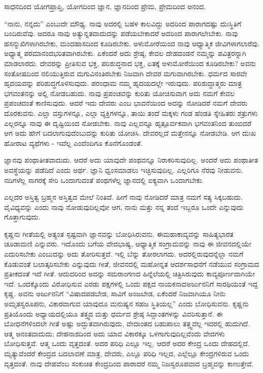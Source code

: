 ಸಾಧನದಿಂದ ಯೋಗಪ್ರಾಪ್ತಿ, ಯೋಗದಿಂದ ಜ್ಞಾನ, ಜ್ಞಾನದಿಂದ ಪ್ರೇಮ, ಪ್ರೇಮದಿಂದ ಆನಂದ.

“ನಾನು, ನನ್ನದು” ಎಂಬುದೇ ಮೌಢ್ಯ. ನಾವು ಅದರಲ್ಲಿ ಬಹಳ ಕಾಲವಿದ್ದು ಅದರಿಂದ ಪಾರಾಗದಷ್ಟು ದುಃಸ್ಥಿತಿಗೆ ಬಂದಿರುವೆವು. ಆದರೂ ನಾವು ಅತ್ಯುನ್ನತವಾದುದನ್ನು ಪಡೆಯಬೇಕಾದರೆ ಅದರಿಂದ ಪಾರಾಗಲೇಬೇಕು. ನಾವು ಹಸನ್ಮುಖಿಗಳಾಗಿರಬೇಕು, ಮಂದಹಾಸದಿಂದ ಕೂಡಿರಬೇಕು. ಅಳುಮೋರೆಯಿಂದ ನಾವು ಆಧ್ಯಾತ್ಮಿಕ ಜೀವಿಗಳಾಗಲಾರೆವು. ಅಧ್ಯಾತ್ಮ ಪರಮಾನಂದಭರಿತವಾಗಿರಬೇಕು. ಏಕೆಂದರೆ ಅದು ಶ್ರೇಷ್ಠ, ಕೇವಲ ದೇಹದಂಡನೆ ನಮ್ಮನ್ನು ಪವಿತ್ರರನ್ನಾಗಿ ಮಾಡಲಾರದು. ದೇವರನ್ನು ಪ್ರೀತಿಸುವ ಭಕ್ತ, ಪರಿಶುದ್ಧನಾದ ಭಕ್ತ, ಏತಕ್ಕೆ ಅಳುಮೋರೆಯಿಂದ ಕೂಡಿರಬೇಕು? ಅವನು ಸಂತೋಷದಿಂದ ನಲಿಯುತ್ತಿರುವ ಮಗುವಿನಂತಿರಬೇಕು ನಿಜವಾಗಿ ದೇವರ ಮಗುವಾಗಿರಬೇಕು. ಧರ್ಮದ ಸಾರವೇ ಹೃದಯವನ್ನು ಪರಿಶುದ್ಧಗೊಳಿಸುವುದು. ಪರಂಧಾಮ ನಮ್ಮ ಹೃದಯದಲ್ಲೇ ಇರುವುದು. ಪರಿಶುದ್ಧಾತ್ಮರು ಮಾತ್ರ ಭಗವಂತನನ್ನು ಅಲ್ಲಿ ನೋಡಬಹುದು. ನಾವು ಪ್ರಪಂಚವನ್ನು ಕುರಿತು ಯೋಚಿಸುವಾಗ ಅದು ನಮಗೆ ಕೇವಲ ಪ್ರಪಂಚದಂತೆ ಕಾಣಿಸುವುದು. ಆದರೆ ಇದು ದೇವರು ಎಂಬ ಭಾವನೆಯಿಂದ ಅದನ್ನು ನೋಡಿದರೆ ನಮಗೆ ದೇವರು ದೊರಕುವನು. ಎಲ್ಲಾ ವಸ್ತುಗಳನ್ನೂ, ಎಲ್ಲಾ ವ್ಯಕ್ತಿಗಳನ್ನೂ, ತಾಯಿ ತಂದೆ ಮಕ್ಕಳು ಗಂಡ ಹೆಂಡತಿ ಸ್ನೇಹಿತರು ಶತ್ರುಗಳು ಎಲ್ಲರನ್ನೂ ನಾವು ಈ ದೃಷ್ಟಿಯಿಂದ ನೋಡಬೇಕು. ನಾವು ಎಲ್ಲವನ್ನೂ ಹೃತ್ಪೂರ್ವಕವಾಗಿ ಭಗವಂತನಿಂದ ತುಂಬಿದರೆ ಆಗ ಅದು ಹೇಗೆ ಬದಲಾಗುವುದೆಂಬುದನ್ನು ಕುರಿತು ಯೋಚಿಸಿ. ದೇವರಲ್ಲದೆ ಮತ್ತೇನನ್ನೂ ನೋಡಬೇಡಿ. ಆಗ ದುಃಖ ಹೋರಾಟ ವ್ಯಥೆಗಳು - ಇವೆಲ್ಲ ಎಂದೆಂದಿಗೂ ಕೊನೆಗೊಂಡಂತೆ.

ಜ್ಞಾನವು ಪಂಥಾತೀತವಾದುದು. ಆದರೆ ಅದು ಯಾವುದೇ ಪಂಥವನ್ನೂ ನಿರಾಕರಿಸುವುದಿಲ್ಲ. ಅಂದರೆ ಅದು ಪಂಥಾತೀತ ಅವಸ್ಥೆಯನ್ನು ಪಡೆದಿದೆ ಎಂದು ಅರ್ಥ. ಜ್ಞಾನಿ ಧ್ವಂಸಮಾಡಲು ಇಚ್ಛಿಸುವುದಿಲ್ಲ. ಎಲ್ಲರಿಗೂ ನೆರವು ನೀಡುವನು. ನದಿಗಳೆಲ್ಲ ಸಾಗರಕ್ಕೆ ಸೇರಿ ಒಂದಾಗುವಂತೆ ಪಂಥಗಳೆಲ್ಲ ಜ್ಞಾನದಲ್ಲಿ ಐಕ್ಯವಾಗಿ ಒಂದಾಗಬೇಕು.

ಎಲ್ಲದರ ಅಸ್ತಿತ್ವ ಬ್ರಹ್ಮನ ಅಸ್ತಿತ್ವದ ಮೇಲೆ ನಿಂತಿದೆ. ಹೀಗೆ ನಾವು ನೋಡಿದರೆ ಮಾತ್ರ ನಮಗೆ ಸತ್ಯ ಸಿಕ್ಕಬಹುದು. ವೈವಿಧ್ಯವನ್ನು ಎಂದು ನಾವು ನೋಡುವುದಿಲ್ಲವೋ ಆಗ, ನಾನು ಮತ್ತು ನನ್ನ ತಂದೆ ಇಬ್ಬರೂ ಒಂದೇ ಎನ್ನುವುದು ಗೊತ್ತಾಗುವುದು.

ಕೃಷ್ಣನು ಗೀತೆಯಲ್ಲಿ ಅತ್ಯಂತ ಸ್ಪಷ್ಟವಾಗಿ ಜ್ಞಾನವನ್ನು ಬೋಧಿಸಿರುವನು. ಈ\break ಮಹಾಕಾವ್ಯವನ್ನು ಸಾಹಿತ್ಯಭಾರತ ಚೂಡಾಮಣಿ ಎನ್ನುವರು. ಇದೊಂದು ಬಗೆಯ ವೇದಭಾಷ್ಯ, ಆಧ್ಯಾತ್ಮಿಕ ಸಂಗ್ರಾಮವನ್ನು ನಾವು ಈ ಜೀವನದಲ್ಲಿಯೇ ಎದುರಿಸಬೇಕು ಎಂಬುದನ್ನು ಅದು ತೋರಿಸುತ್ತದೆ. ಇಲ್ಲಿ ಬೆನ್ನು ತೋರಲಾಗದು. ಅದರಲ್ಲಿರುವುದನ್ನೆಲ್ಲಾ ನಮಗೆ ಕೊಡುವಂತೆ ಬಲಾತ್ಕರಿಸಬೇಕು ಎನ್ನುವುದು ಗೀತೆ, ಜೀವನದಲ್ಲಿ ಮಹೋನ್ನತ ಆದರ್ಶಸಾಧನೆಗೆ ನಡೆಯುವ ಸಂಗ್ರಾಮದ ಪ್ರತೀಕದಂತೆ ಇದೆ ಗೀತೆ. ಆದುದರಿಂದ ಅದನ್ನು ಸಮರಾಂಗಣದ ಹಿನ್ನೆಲೆಯಲ್ಲಿ ಚಿತ್ರಿಸಿರುವುದು ಕಾವ್ಯಪೂರ್ಣವಾಗಿಯೇ ಇದೆ. ಒಂದಕ್ಕೊಂದು ವಿರೋಧಿಸುವ ಎರಡು ಪಕ್ಷಗಳಲ್ಲಿ ಒಂದು ಪಕ್ಷದ ನಾಯಕನಾದ\break ಅರ್ಜುನನಿಗೆ ಸಾರಥಿಯಂತೆ ಇದ್ದ ಕೃಷ್ಣ. ಅವನು ಅರ್ಜುನನಿಗೆ “ವಿಷಾದಪಡಬೇಡ, ಸಾವಿಗೆ ಅಂಜಬೇಡ, ಏಕೆಂದರೆ ನಿಜವಾಗಿಯೂ ನೀನು ಅಮೃತಸ್ವರೂಪನು, ವಿಕಾರವಾಗುವ ಯಾವುದೂ ಮನುಷ್ಯನ ಸಹಜ ಸ್ಥಿತಿಯಲ್ಲ'' ಎಂದು ಬೋಧಿಸುವನು. ಕೃಷ್ಣನು ಪ್ರತಿಯೊಂದು ಅಧ್ಯಾಯದಲ್ಲಿಯೂ ತತ್ತ್ವದ ಮತ್ತು ಧರ್ಮದ ಶ್ರೇಷ್ಠ ಸಿದ್ದಾಂತಗಳನ್ನು ವಿವರಿಸುತ್ತಾನೆ. ಈ ಬೋಧನೆಗಳಿಂದಲೇ ಗೀತೆ ಅಷ್ಟು ಅದ್ಭುತವಾಗಿರುವುದು, ವೇದಾಂತದ ಬಹುಪಾಲು ತತ್ತ್ವವೆಲ್ಲ ಇದರಲ್ಲಿ ಹುದುಗಿದೆ. ಆತ್ಮ ಅನಂತವಾದುದು; ದೇಹನಾಶದಿಂದ ಅದು ಯಾವ ವಿಕಾರಕ್ಕೂ ಒಳಗಾಗುವುದಿಲ್ಲವೆಂದು ವೇದಗಳು ಬೋಧಿಸುತ್ತವೆ. ಆತ್ಮ ಒಂದು ವೃತ್ತದಂತೆ. ಅದರ ಪರಿಧಿ ಎಲ್ಲೂ ಇಲ್ಲ. ಆದರೆ ಅದರ ಕೇಂದ್ರ ಒಂದು ದೇಹದಲ್ಲಿದೆ. ಮೃತ್ಯುವೆಂದರೆ ಕೇಂದ್ರದ ಬದಲಾವಣೆ ಮಾತ್ರ, ದೇವರು, ಎಲ್ಲೂ ಪರಿಧಿ ಇಲ್ಲದ, ಎಲ್ಲೆಲ್ಲೂ ಕೇಂದ್ರಗಳಿರುವ ಒಂದು ವೃತ್ತದಂತೆ. ನಾವು ದೇಹವೆಂಬ ಸಂಕುಚಿತ ಕೇಂದ್ರದಿಂದ ಪಾರಾದರೆ ನಮ್ಮ ನಿಜಸ್ವರೂಪವಾದ ಬ್ರಹ್ಮವನ್ನು ಕಾಣುತ್ತೇವೆ.

